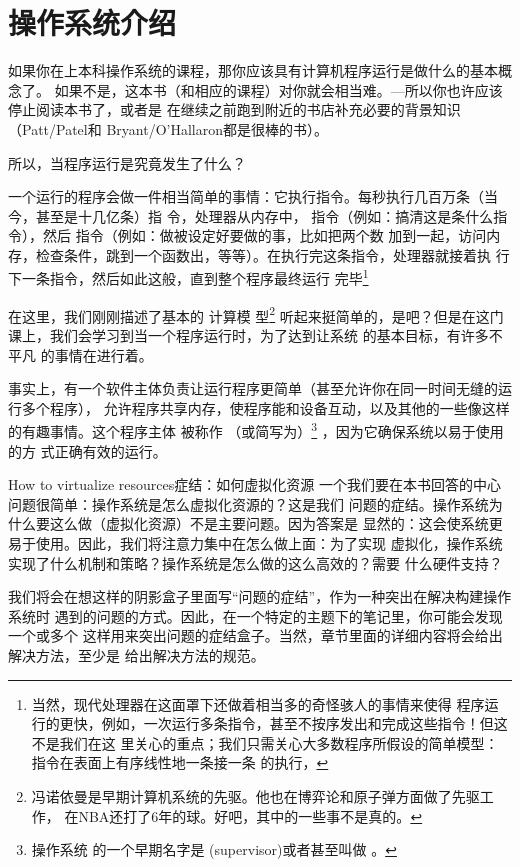 \chapter{操作系统介绍}
如果你在上本科操作系统的课程，那你应该具有计算机程序运行是做什么的基本概念了。
如果不是，这本书（和相应的课程）对你就会相当难。---所以你也许应该停止阅读本书了，或者是
在继续之前跑到附近的书店补充必要的背景知识（Patt/Patel和
Bryant/O'Hallaron都是很棒的书）。

所以，当程序运行是究竟发生了什么？

一个运行的程序会做一件相当简单的事情：它执行指令。每秒执行几百万条（当今，甚至是十几亿条）指
令，处理器从内存中，
指令（例如：搞清这是条什么指令），然后
指令（例如：做被设定好要做的事，比如把两个数
加到一起，访问内存，检查条件，跳到一个函数出，等等）。在执行完这条指令，处理器就接着执
行下一条指令，然后如此这般，直到整个程序最终运行
完毕\footnote{当然，现代处理器在这面罩下还做着相当多的奇怪骇人的事情来使得
	程序运行的更快，例如，一次运行多条指令，甚至不按序发出和完成这些指令！但这不是我们在这
	里关心的重点；我们只需关心大多数程序所假设的简单模型：指令在表面上有序线性地一条接一条
	的执行，}

在这里，我们刚刚描述了基本的
计算模
型\footnote{冯诺依曼是早期计算机系统的先驱。他也在博弈论和原子弹方面做了先驱工作，
	在NBA还打了6年的球。好吧，其中的一些事不是真的。}
听起来挺简单的，是吧？但是在这门课上，我们会学习到当一个程序运行时，为了达到让系统
的基本目标，有许多不平凡
的事情在进行着。

事实上，有一个软件主体负责让运行程序更简单（甚至允许你在同一时间无缝的运行多个程序），
允许程序共享内存，使程序能和设备互动，以及其他的一些像这样的有趣事情。这个程序主体
被称作
（或简写为）\footnote{操作系统
	的一个早期名字是 (supervisor)或者甚至叫做
	。} ，因为它确保系统以易于使用的方
式正确有效的运行。

\begin{mycrux}{How to virtualize resources}{症结：如何虚拟化资源} %
	一个我们要在本书回答的中心问题很简单：操作系统是怎么虚拟化资源的？这是我们
	问题的症结。操作系统为什么要这么做（虚拟化资源）不是主要问题。因为答案是
	显然的：这会使系统更易于使用。因此，我们将注意力集中在怎么做上面：为了实现
	虚拟化，操作系统实现了什么机制和策略？操作系统是怎么做的这么高效的？需要
	什么硬件支持？
	
	我们将会在想这样的阴影盒子里面写“问题的症结”，作为一种突出在解决构建操作系统时
	遇到的问题的方式。因此，在一个特定的主题下的笔记里，你可能会发现一个或多个
	这样用来突出问题的症结盒子。当然，章节里面的详细内容将会给出解决方法，至少是
	给出解决方法的规范。
\end{mycrux}

